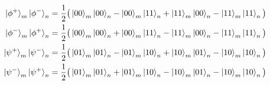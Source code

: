 \documentclass[a4paper,11pt]{article}
\begin{document}
\begin{align*}
\ket{\phi^+}_{m} \ket{\phi^-}_{n} = \dfrac{1}{2} \big(\ket{00}_m \ket{00}_n - \ket{00}_m \ket{11}_n + \ket{11}_m \ket{00}_n - \ket{11}_m \ket{11}_n \big) \nonumber \\
\ket{\phi^-}_{m} \ket{\phi^+}_{n} = \dfrac{1}{2} \big(\ket{00}_m \ket{00}_n + \ket{00}_m \ket{11}_n - \ket{11}_m \ket{00}_n - \ket{11}_m \ket{11}_n \big) \nonumber \\
\ket{\psi^+}_{m} \ket{\psi^-}_{n} = \dfrac{1}{2} \big(\ket{01}_m \ket{01}_n - \ket{01}_m \ket{10}_n + \ket{10}_m \ket{01}_n - \ket{10}_m \ket{10}_n \big)
\nonumber \\
\ket{\psi^-}_{m} \ket{\psi^+}_{n} = \dfrac{1}{2} \big(\ket{01}_m \ket{01}_n + \ket{01}_m \ket{10}_n - \ket{10}_m \ket{01}_n - \ket{10}_m \ket{10}_n \big)
\end{align*}


\end{document}
